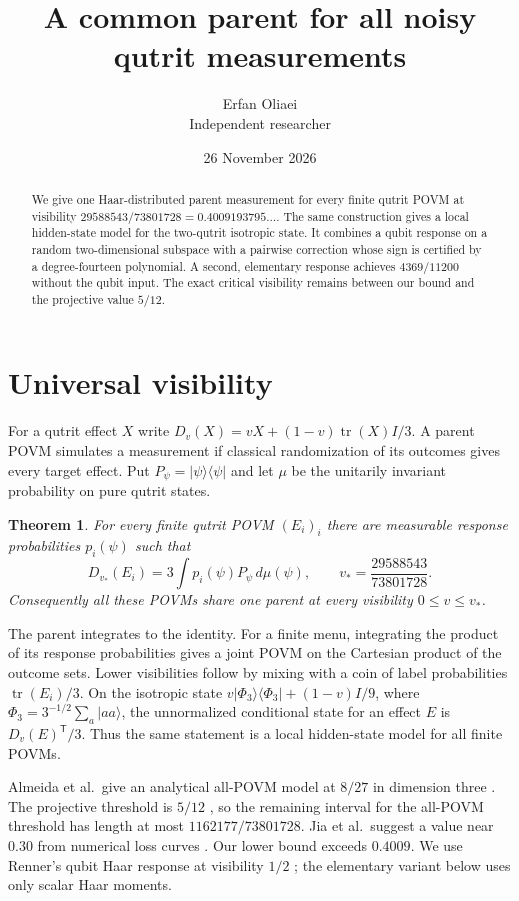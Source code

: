 \documentclass[10pt,a4paper]{article}
\author{Erfan Oliaei\\[2pt]\small Independent researcher}
\date{26 November 2026}
\title{A common parent for all noisy qutrit measurements}
\newtheorem{theorem}{Theorem}
\newcommand{\tr}{\operatorname{tr}}
\newcommand{\ray}[1]{\lvert #1\rangle\langle #1\rvert}
\begin{document}
\maketitle
\begin{abstract}
We give one Haar-distributed parent measurement for every finite qutrit POVM at visibility \(29588543/73801728=0.4009193795\ldots\). The same construction gives a local hidden-state model for the two-qutrit isotropic state. It combines a qubit response on a random two-dimensional subspace with a pairwise correction whose sign is certified by a degree-fourteen polynomial. A second, elementary response achieves \(4369/11200\) without the qubit input. The exact critical visibility remains between our bound and the projective value \(5/12\).
\end{abstract}
\section{Universal visibility}
For a qutrit effect \(X\) write \(D_v(X)=vX+(1-v)\tr(X)I/3\).
A parent POVM simulates a measurement if classical randomization of its outcomes gives every target effect. Put \(P_\psi=\ray{\psi}\) and let \(\mu\) be the unitarily invariant probability on pure qutrit states.
\begin{theorem}
For every finite qutrit POVM \((E_i)_i\) there are measurable response probabilities \(p_i(\psi)\) such that
\[
 D_{v_*}(E_i)=3\int p_i(\psi)P_\psi\,d\mu(\psi),\qquad
 v_*=\frac{29588543}{73801728}.
\]
Consequently all these POVMs share one parent at every visibility \(0\le v\le v_*\).
\end{theorem}
The parent integrates to the identity. For a finite menu, integrating the product of its response probabilities gives a joint POVM on the Cartesian product of the outcome sets. Lower visibilities follow by mixing with a coin of label probabilities \(\tr(E_i)/3\). On the isotropic state
\(v\ray{\Phi_3}+(1-v)I/9\), where \(\Phi_3=3^{-1/2}\sum_a|aa\rangle\), the unnormalized conditional state for an effect \(E\) is \(D_v(E)^{\mathsf T}/3\). Thus the same statement is a local hidden-state model for all finite POVMs.

Almeida et al.\ give an analytical all-POVM model at \(8/27\) in dimension three \cite{almeida}. The projective threshold is \(5/12\) \cite{wiseman}, so the remaining interval for the all-POVM threshold has length at most \(1162177/73801728\). Jia et al.\ suggest a value near \(0.30\) from numerical loss curves \cite[Sec.~V.2]{jia}. Our lower bound exceeds \(0.4009\). We use Renner's qubit Haar response at visibility \(1/2\) \cite{renner}; the elementary variant below uses only scalar Haar moments.
\end{document}
